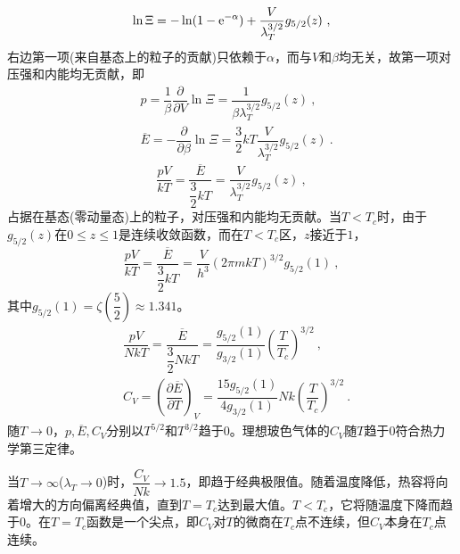 \documentclass[12pt,a4paper]{article}
\begin{document}
\begin{align}
\nonumber \ln { \Xi} = -\ln(1-{\rm e}^{-\alpha}) + \dfrac{V}{\lambda^{3/2}_T} g_{5/2}(z) ~,
\end{align}
右边第一项(来自基态上的粒子的贡献)只依赖于$\alpha$，而与$V$和$\beta$均无关，故第一项对压强和内能均无贡献，即
\begin{align}
& p = \dfrac{1}{\beta} \dfrac{\partial }{\partial V} \ln { \Xi} =  \dfrac{1}{\beta \lambda^{3/2}_T} g_{5/2}(z) ~, \\
& \overline{E} = -\dfrac{\partial }{\partial \beta} \ln { \Xi} = \dfrac{3}{2} k T  \dfrac{V}{\lambda^{3/2}_T} g_{5/2}(z) ~.
\end{align}
\begin{equation}
\dfrac{pV}{kT} = \dfrac{\overline{E}}{\dfrac{3}{2} kT} = \dfrac{V}{\lambda^{3/2}_T} g_{5/2}(z) ~,
\end{equation}
占据在基态(零动量态)上的粒子，对压强和内能均无贡献。当$T < T_c$时，由于$g_{5/2}(z)$在$0 \leqslant z \leqslant 1$是连续收敛函数，而在$T < T_c$区，$z$接近于$1$，
\begin{equation}
\dfrac{pV}{kT} = \dfrac{\overline{E}}{\dfrac{3}{2} kT} = \dfrac{V}{h^3} (2\pi m kT)^{3/2} g_{5/2}(1) ~,
\end{equation}
其中$g_{5/2}(1) = \zeta \left(\dfrac{5}{2} \right) \approx 1.341$。
\begin{align}
& \dfrac{pV}{NkT} = \dfrac{\overline{E}}{\dfrac{3}{2} NkT} = \dfrac{g_{5/2}(1)}{g_{3/2}(1)} \left( \dfrac{T}{T_c} \right)^{3/2} ~, \\
& C_V = \left( \dfrac{\partial \overline{E} }{\partial T} \right)_V = \dfrac{15 g_{5/2}(1)}{4 g_{3/2}(1)} Nk \left( \dfrac{T}{T_c} \right)^{3/2} ~.
\end{align}
随$T \rightarrow 0$，$p, \overline{E}, C_V$分别以$T^{5/2}$和$T^{3/2}$趋于$0$。理想玻色气体的$C_V$随$T$趋于$0$符合热力学第三定律。

当$T \rightarrow \infty$($\lambda_T \rightarrow 0$)时，$\dfrac{C_V}{Nk} \rightarrow 1.5$，即趋于经典极限值。随着温度降低，热容将向着增大的方向偏离经典值，直到$T= T_c$达到最大值。$T < T_c$，它将随温度下降而趋于$0$。在$T= T_c$函数是一个尖点，即$C_V$对$T$的微商在$T_c$点不连续，但$C_V$本身在$T_c$点连续。
\end{document}
